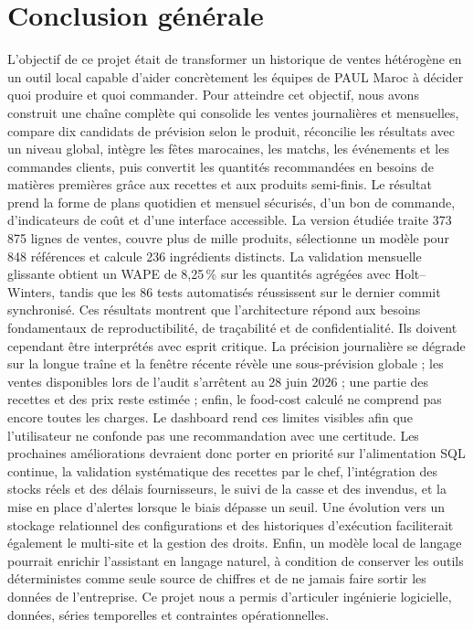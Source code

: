 \clearpage
\chapter*{Conclusion générale}
{}
\vspace{-1\baselineskip}
{

L'objectif de ce projet était de transformer un historique de ventes hétérogène en
un outil local capable d'aider concrètement les équipes de PAUL Maroc à décider
quoi produire et quoi commander. Pour atteindre cet objectif, nous avons construit
une chaîne complète qui consolide les ventes journalières et mensuelles, compare
dix candidats de prévision selon le produit, réconcilie les résultats avec un
niveau global, intègre les fêtes marocaines, les matchs, les événements et les
commandes clients, puis convertit les quantités recommandées en besoins de matières
premières grâce aux recettes et aux produits semi-finis. Le résultat prend la
forme de plans quotidien et mensuel sécurisés, d'un bon de commande,
d'indicateurs de coût et d'une interface accessible. La version étudiée
traite 373\,875 lignes de ventes, couvre plus de mille produits, sélectionne un
modèle pour 848 références et calcule 236 ingrédients distincts. La validation
mensuelle glissante obtient un WAPE de 8,25\,\% sur les quantités agrégées avec
Holt--Winters, tandis que les 86 tests automatisés réussissent sur le dernier
commit synchronisé. Ces résultats montrent que l'architecture répond aux besoins
fondamentaux de reproductibilité, de traçabilité et de confidentialité. Ils doivent
cependant être interprétés avec esprit critique. La précision journalière se
dégrade sur la longue traîne et la fenêtre récente révèle une sous-prévision
globale ; les ventes disponibles lors de l'audit s'arrêtent au 28 juin 2026 ; une
partie des recettes et des prix reste estimée ; enfin, le food-cost calculé ne
comprend pas encore toutes les charges. Le dashboard rend ces limites visibles
afin que l'utilisateur ne confonde pas une recommandation avec une certitude. Les
prochaines améliorations devraient donc porter en priorité sur l'alimentation SQL
continue, la validation systématique des recettes par le chef, l'intégration des
stocks réels et des délais fournisseurs, le suivi de la casse et des invendus, et
la mise en place d'alertes lorsque le biais dépasse un seuil. Une évolution vers
un stockage relationnel des configurations et des historiques d'exécution
faciliterait également le multi-site et la gestion des droits. Enfin, un modèle
local de langage pourrait enrichir l'assistant en langage naturel, à condition de
conserver les outils déterministes comme seule source de chiffres et de ne jamais
faire sortir les données de l'entreprise. Ce projet nous a permis d'articuler
ingénierie logicielle, données, séries temporelles et contraintes opérationnelles.
\par}
